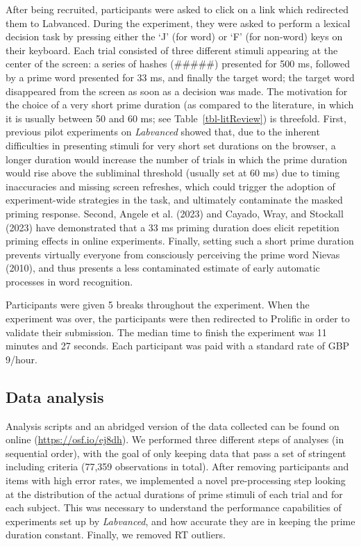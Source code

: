 \documentclass[
]{interact}
\begin{document}
After being recruited, participants were asked to click on a link which
redirected them to Labvanced. During the experiment, they were asked to
perform a lexical decision task by pressing either the `J' (for word) or
`F' (for non-word) keys on their keyboard. Each trial consisted of three
different stimuli appearing at the center of the screen: a series of
hashes (\#\#\#\#\#) presented for 500 ms, followed by a prime word
presented for 33 ms, and finally the target word; the target word
disappeared from the screen as soon as a decision was made. The
motivation for the choice of a very short prime duration (as compared to
the literature, in which it is usually between 50 and 60 ms; see
Table~\ref{tbl-litReview}) is threefold. First, previous pilot
experiments on \emph{Labvanced} showed that, due to the inherent
difficulties in presenting stimuli for very short set durations on the
browser, a longer duration would increase the number of trials in which
the prime duration would rise above the subliminal threshold (usually
set at 60 ms) due to timing inaccuracies and missing screen refreshes,
which could trigger the adoption of experiment-wide strategies in the
task, and ultimately contaminate the masked priming response. Second,
Angele et al. (2023) and Cayado, Wray, and Stockall (2023) have
demonstrated that a 33 ms priming duration does elicit repetition
priming effects in online experiments. Finally, setting such a short
prime duration prevents virtually everyone from consciously perceiving
the prime word Nievas (2010), and thus presents a less contaminated
estimate of early automatic processes in word recognition.

Participants were given 5 breaks throughout the experiment. When the
experiment was over, the participants were then redirected to Prolific
in order to validate their submission. The median time to finish the
experiment was 11 minutes and 27 seconds. Each participant was paid with
a standard rate of GBP 9/hour.

\subsection{Data analysis}\label{sec-exp1-analysis}

Analysis scripts and an abridged version of the data collected can be
found on online (\url{https://osf.io/ej8dh}). We performed three
different steps of analyses (in sequential order), with the goal of only
keeping data that pass a set of stringent including criteria (77,359
observations in total). After removing participants and items with high
error rates, we implemented a novel pre-processing step looking at the
distribution of the actual durations of prime stimuli of each trial and
for each subject. This was necessary to understand the performance
capabilities of experiments set up by \emph{Labvanced}, and how accurate
they are in keeping the prime duration constant. Finally, we removed RT
outliers.
\end{document}
